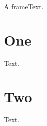 \documentclass{beamer}
\begin{document}
\ifdefined\testbeamer
\begin{frame}{A frame}Text.\end{frame}
\else
\section{One}
Text.

\section{Two}
Text.
\fi
\end{document}

